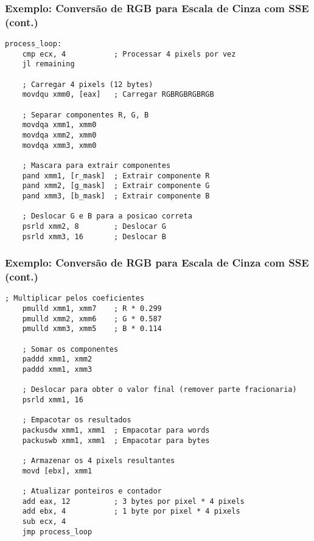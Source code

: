 \documentclass[11pt]{beamer}
\begin{document}
\begin{frame}[fragile]
\frametitle{Exemplo: Conversão de RGB para Escala de Cinza com SSE (cont.)}

\begin{lstlisting}[language={[x86masm]Assembler}, basicstyle=\tiny]    
process_loop:
    cmp ecx, 4           ; Processar 4 pixels por vez
    jl remaining
    
    ; Carregar 4 pixels (12 bytes)
    movdqu xmm0, [eax]   ; Carregar RGBRGBRGBRGB
    
    ; Separar componentes R, G, B
    movdqa xmm1, xmm0
    movdqa xmm2, xmm0
    movdqa xmm3, xmm0
    
    ; Mascara para extrair componentes
    pand xmm1, [r_mask]  ; Extrair componente R
    pand xmm2, [g_mask]  ; Extrair componente G
    pand xmm3, [b_mask]  ; Extrair componente B
    
    ; Deslocar G e B para a posicao correta
    psrld xmm2, 8        ; Deslocar G
    psrld xmm3, 16       ; Deslocar B
\end{lstlisting}

\end{frame}

\begin{frame}[fragile]
\frametitle{Exemplo: Conversão de RGB para Escala de Cinza com SSE (cont.)}

\begin{lstlisting}[language={[x86masm]Assembler}, basicstyle=\tiny]    
    ; Multiplicar pelos coeficientes
    pmulld xmm1, xmm7    ; R * 0.299
    pmulld xmm2, xmm6    ; G * 0.587
    pmulld xmm3, xmm5    ; B * 0.114
    
    ; Somar os componentes
    paddd xmm1, xmm2
    paddd xmm1, xmm3
    
    ; Deslocar para obter o valor final (remover parte fracionaria)
    psrld xmm1, 16
    
    ; Empacotar os resultados
    packusdw xmm1, xmm1  ; Empacotar para words
    packuswb xmm1, xmm1  ; Empacotar para bytes
    
    ; Armazenar os 4 pixels resultantes
    movd [ebx], xmm1
    
    ; Atualizar ponteiros e contador
    add eax, 12          ; 3 bytes por pixel * 4 pixels
    add ebx, 4           ; 1 byte por pixel * 4 pixels
    sub ecx, 4
    jmp process_loop
\end{lstlisting}

\end{frame}
\end{document}
